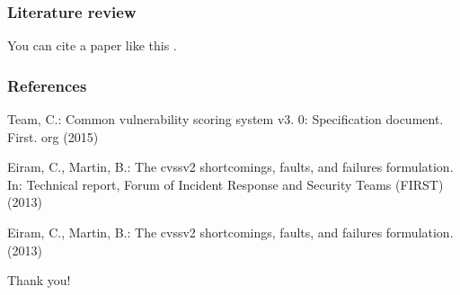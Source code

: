 \documentclass[14pt]{beamer}
\begin{document}
\begin{frame}
\frametitle{Literature review}
You can cite a paper like this \cite{team2015common,eiram2013cvssv2,eiram2013}.
\end{frame}


\begin{frame}
\frametitle{References}

\begin{thebibliography}{99} %

Team, C.: Common vulnerability scoring system v3. 0: Specification document.
  First. org  (2015)
  
Eiram, C., Martin, B.: The cvssv2 shortcomings, faults, and failures
  formulation. In: Technical report, Forum of Incident Response and Security
  Teams (FIRST) (2013)
  
Eiram, C., Martin, B.: The cvssv2 shortcomings, faults, and failures
  formulation. (2013)
  

\end{thebibliography}
\end{frame}

\begin{frame}
\Huge{\centerline{Thank you!}}
\end{frame}



\end{document}
